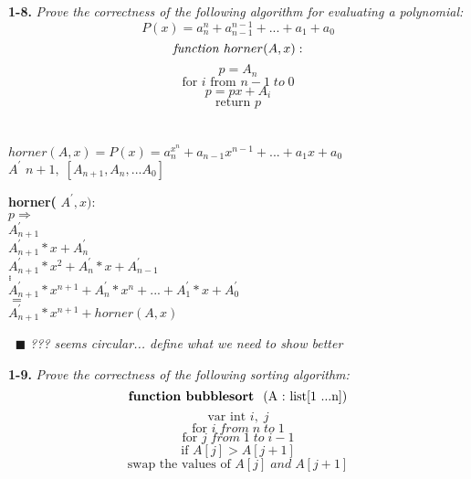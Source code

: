 \textbf{1-8.} \emph{Prove the correctness of the following algorithm for evaluating a polynomial:}
$$P(x) = a_{n}^{n} + a_{n-1}^{n-1} + ... +a_{1} + a_{0}$$ 
$$\text{\emph{function} } horner(A, x):$$  
$$p = A_{n}$$  
$$\text{for } i \text{ from } n - 1 \;to\; 0$$ 
$$p = px + A_{i}$$ 
$$\text{return } p$$ 
\\
\\
$horner(A,x) = P(x) = a_{n}^{x^n} + a_{n-1}x^{n-1} + ... + a_{1}x + a_{0}$ \\
$A^{'}$
$n + 1, \; [A_{n+1}, A_{n}, ... A_{0}]$ 
\begin{center}
\textbf{horner(} 
$A^{'}, x) : $\\
$p \Rightarrow$ \\
$A^{'}_{n+1}$ \\
$A^{'}_{n+1}*x + A^{'}_{n}$ \\
$A^{'}_{n+1}*x^{2} + A^{'}_{n}*x + A^{'}_{n-1}$ \\
$. $\\
$. $\\
$. $\\
$A^{'}_{n+1}*x^{n+1} + A^{'}_{n}*x^{n} + ... + A^{'}_{1}*x + A^{'}_{0}$ \\
$=$ \\
$A^{'}_{n+1}*x^{n+1} + horner(A, x) $\\
\end{center}
$\;\; \blacksquare$
\emph{??? seems circular... define what we need to show better}

 	
 		


\textbf{1-9.} \emph{Prove the correctness of the following sorting algorithm:} 
$$\text{\textbf{function bubblesort } (A : list[1 ...n])} $$ 
$$\text{var  int } i,\; j$$
$$\text{for } i \;from\; n \;to\; 1 $$
$$\text{for } j \;from\; 1  \;to\; i - 1 $$
$$\text{if } A[j] > A[j + 1] $$
$$\text{swap the values of } A[j] \;and\; A[j + 1] $$


